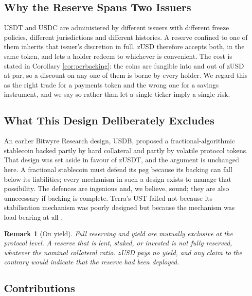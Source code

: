 \documentclass[11pt,a4paper]{article}
\newtheorem{remark}[theorem]{Remark}
\begin{document}
\subsection{Why the Reserve Spans Two Issuers}

USDT and USDC are administered by different issuers with different freeze policies, different jurisdictions and different histories. A reserve confined to one of them inherits that issuer's discretion in full. zUSD therefore accepts both, in the same token, and lets a holder redeem to whichever is convenient. The cost is stated in Corollary \ref{cor:perbacking}: the coins are fungible into and out of zUSD at par, so a discount on any one of them is borne by every holder. We regard this as the right trade for a payments token and the wrong one for a savings instrument, and we say so rather than let a single ticker imply a single risk.

\subsection{What This Design Deliberately Excludes}

An earlier Bitwyre Research design, USDB, proposed a fractional-algorithmic stablecoin backed partly by hard collateral and partly by volatile protocol tokens. That design was set aside in favour of zUSDT, and the argument is unchanged here. A fractional stablecoin must defend its peg because its backing can fall below its liabilities; every mechanism in such a design exists to manage that possibility. The defences are ingenious and, we believe, sound; they are also unnecessary if backing is complete. Terra's UST failed not because its stabilisation mechanism was poorly designed but because the mechanism was load-bearing at all \cite{terra}.

\begin{remark}[On yield]
Full reserving and yield are mutually exclusive at the protocol level. A reserve that is lent, staked, or invested is not fully reserved, whatever the nominal collateral ratio. zUSD pays no yield, and any claim to the contrary would indicate that the reserve had been deployed.
\end{remark}

\subsection{Contributions}
\end{document}
